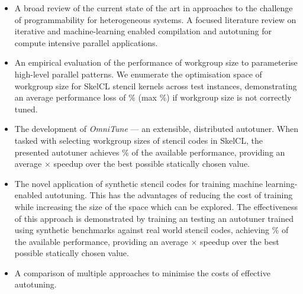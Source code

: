\begin{itemize}
\item A broad review of the current state of the art in approaches to
  the challenge of programmability for heterogeneous systems. A
  focused literature review on iterative and machine-learning enabled
  compilation and autotuning for compute intensive parallel
  applications.
\item An empirical evaluation of the performance of workgroup size to
  parameterise high-level parallel patterns. We enumerate the
  optimisation space of workgroup size for SkelCL stencil kernels
  across  test instances, demonstrating
  an average performance loss of
  $\%$ (max
  $\%$) if workgroup size is not
  correctly tuned.
\item The development of \emph{OmniTune} --- an extensible,
  distributed autotuner. When tasked with selecting workgroup sizes of
  stencil codes in SkelCL, the presented autotuner achieves
  $\%$ of the available
  performance, providing an average
  $\times$ speedup over the
  best possible statically chosen value.
\item The novel application of synthetic  stencil codes for training machine learning-enabled
  autotuning. This has the advantages of reducing the cost of training
  while increasing the size of the space which can be explored. The
  effectiveness of this approach is demonstrated by training an
  testing an autotuner trained using synthetic benchmarks against
   real world stencil codes, achieving
  $\%$
  of the available performance, providing an average
  $\times$
  speedup over the best possible statically chosen value.
\item A comparison of multiple approaches to minimise the costs of
  effective autotuning. 
\end{itemize}

